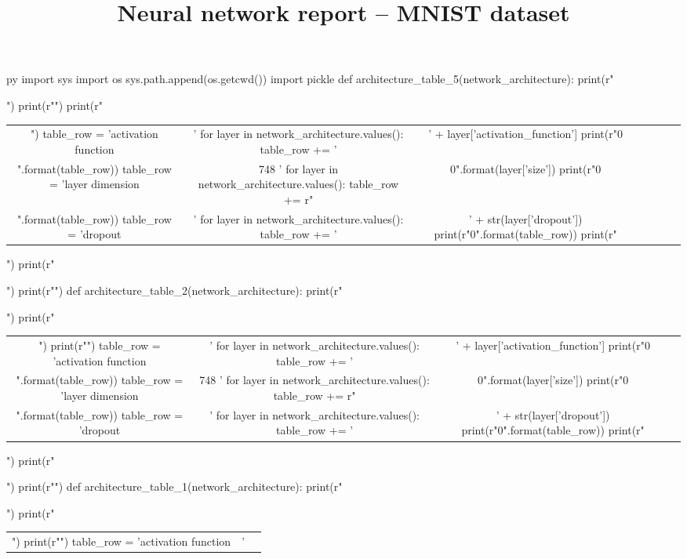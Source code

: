 \documentclass[11pt]{article}
\title{\vspace{-8ex}Neural network report -- MNIST dataset}
\date{\vspace{-12ex}}
\begin{document}
\maketitle
\begin{pythontexcustomcode}{py}
import sys
import os
sys.path.append(os.getcwd())
import pickle
def architecture_table_5(network_architecture):
    print(r"\begin{table}[H]")
    print(r"\centering")
    print(r"\begin{tabular}{cc|c|c|c|c|c}")
    table_row = 'activation function & '
    for layer in network_architecture.values():
        table_row += ' & ' + layer['activation_function']
    print(r"{0} \\".format(table_row))
    table_row = 'layer dimension & \LARGE 748 '
    for layer in network_architecture.values():
        table_row += r"& \LARGE {0}".format(layer['size'])
    print(r"{0} \\".format(table_row))
    table_row = 'dropout & '
    for layer in network_architecture.values():
        table_row += '& ' + str(layer['dropout'])
    print(r"{0}".format(table_row))
    print(r"\end{tabular}")
    print(r"\end{table}")
    print(r"")
def architecture_table_2(network_architecture):
    print(r"\begin{table}[H]")
    print(r"\begin{tabular}{cc|c|c}")
    print(r"\centering")
    table_row = 'activation function & '
    for layer in network_architecture.values():
        table_row += ' & ' + layer['activation_function']
    print(r"{0} \\".format(table_row))
    table_row = 'layer dimension & \LARGE 748 '
    for layer in network_architecture.values():
        table_row += r"& \LARGE {0}".format(layer['size'])
    print(r"{0} \\".format(table_row))
    table_row = 'dropout & '
    for layer in network_architecture.values():
        table_row += '& ' + str(layer['dropout'])
    print(r"{0}".format(table_row))
    print(r"\end{tabular}")
    print(r"\end{table}")
    print(r"")
def architecture_table_1(network_architecture):
    print(r"\begin{table}[H]")
    print(r"\begin{tabular}{cc|c}")
    print(r"\centering")
    table_row = 'activation function & '

\end{tabular}
\end{table}
\end{pythontexcustomcode}
\end{document}
